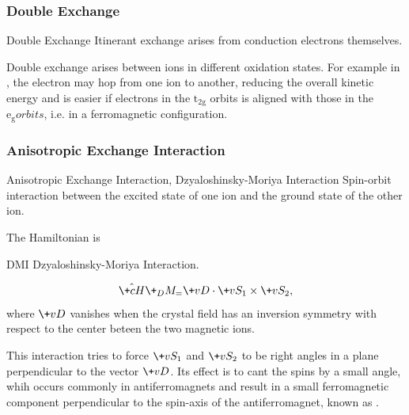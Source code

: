 \documentclass[hidelinks]{article}
\begin{document}

\subsubsection{Double Exchange} %
\label{ssub:double_exchange}

\begin{termdef}{Double Exchange}
    Itinerant exchange arises from conduction electrons themselves.
\end{termdef}

Double exchange arises between ions in different oxidation states. For example in , the electron may hop from one  ion to another, reducing the overall kinetic energy and is easier if electrons in the $\mathrm{t_{2g}}$ orbits is aligned with those in the $\mathrm{e_{g}} orbits$, i.e. in a ferromagnetic configuration. 


\subsubsection{Anisotropic Exchange Interaction} %
\label{ssub:anisotropic_exchange_interaction}

\begin{termdef}{Anisotropic Exchange Interaction, Dzyaloshinsky-Moriya Interaction}
    Spin-orbit interaction between the excited state of one ion and the ground state of the other ion.
\end{termdef}
The Hamiltonian is \begin{margindef}[2\baselineskip]{DMI}
    Dzyaloshinsky-Moriya Interaction.
\end{margindef}
\[ \hat{\+cH}\+_DM_ = \+vD\cdot \+vS_1 \times \+vS_2, \]
where $\+vD$ vanishes when the crystal field has an inversion symmetry with respect to the center beteen the two magnetic ions.
\par
This interaction tries to force $\+vS_1$ and $\+vS_2$ to be right angles in a plane perpendicular to the vector $\+vD$. Its effect is to cant the spins by a small angle, whih occurs commonly in antiferromagnets and result in a small ferromagnetic component perpendicular to the spin-axis of the antiferromagnet, known as .


\end{document}
